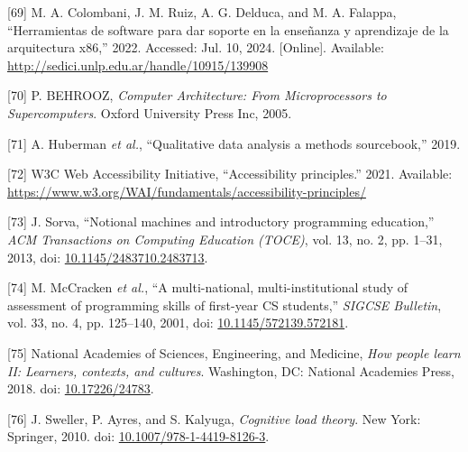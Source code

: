 \documentclass[12pt,oneside]{templates/unerthesis}
\newcommand{\CSLLeftMargin}[1]{#1} %
\newcommand{\CSLRightInline}[1]{#1} %
\newlength{\cslhangindent}
\newenvironment{CSLReferences}[2] %
 {\setlength{\parindent}{0pt}%
  \setlength{\leftskip}{#1 pt\relax}%
  \setlength{\parskip}{#2 pt\relax}%
  \everypar{\setlength{\hangindent}{\cslhangindent}}}
 {\par}
\begin{document}
\begin{CSLReferences}{0}{0}
\leavevmode{}%
\CSLLeftMargin{{[}69{]} }%
\CSLRightInline{M. A. Colombani, J. M. Ruiz, A. G. Delduca, and M. A. Falappa, {``Herramientas de software para dar soporte en la enseñanza y aprendizaje de la arquitectura x86,''} 2022. Accessed: Jul. 10, 2024. {[}Online{]}. Available: \url{http://sedici.unlp.edu.ar/handle/10915/139908}}

\leavevmode{}%
\CSLLeftMargin{{[}70{]} }%
\CSLRightInline{P. BEHROOZ, \emph{Computer {Architecture}: {From} {Microprocessors} to {Supercomputers}}. Oxford University Press Inc, 2005.}

\leavevmode{}%
\CSLLeftMargin{{[}71{]} }%
\CSLRightInline{A. Huberman \emph{et al.}, {``Qualitative data analysis a methods sourcebook,''} 2019.}

\leavevmode{}%
\CSLLeftMargin{{[}72{]} }%
\CSLRightInline{W3C Web Accessibility Initiative, {``Accessibility principles.''} 2021. Available: \url{https://www.w3.org/WAI/fundamentals/accessibility-principles/}}

\leavevmode{}%
\CSLLeftMargin{{[}73{]} }%
\CSLRightInline{J. Sorva, {``Notional machines and introductory programming education,''} \emph{ACM Transactions on Computing Education (TOCE)}, vol. 13, no. 2, pp. 1--31, 2013, doi: \href{https://doi.org/10.1145/2483710.2483713}{10.1145/2483710.2483713}.}

\leavevmode{}%
\CSLLeftMargin{{[}74{]} }%
\CSLRightInline{M. McCracken \emph{et al.}, {``A multi-national, multi-institutional study of assessment of programming skills of first-year CS students,''} \emph{SIGCSE Bulletin}, vol. 33, no. 4, pp. 125--140, 2001, doi: \href{https://doi.org/10.1145/572139.572181}{10.1145/572139.572181}.}

\leavevmode{}%
\CSLLeftMargin{{[}75{]} }%
\CSLRightInline{National Academies of Sciences, Engineering, and Medicine, \emph{How people learn II: Learners, contexts, and cultures}. Washington, DC: National Academies Press, 2018. doi: \href{https://doi.org/10.17226/24783}{10.17226/24783}.}

\leavevmode{}%
\CSLLeftMargin{{[}76{]} }%
\CSLRightInline{J. Sweller, P. Ayres, and S. Kalyuga, \emph{Cognitive load theory}. New York: Springer, 2010. doi: \href{https://doi.org/10.1007/978-1-4419-8126-3}{10.1007/978-1-4419-8126-3}.}


\end{CSLReferences}
\end{document}
